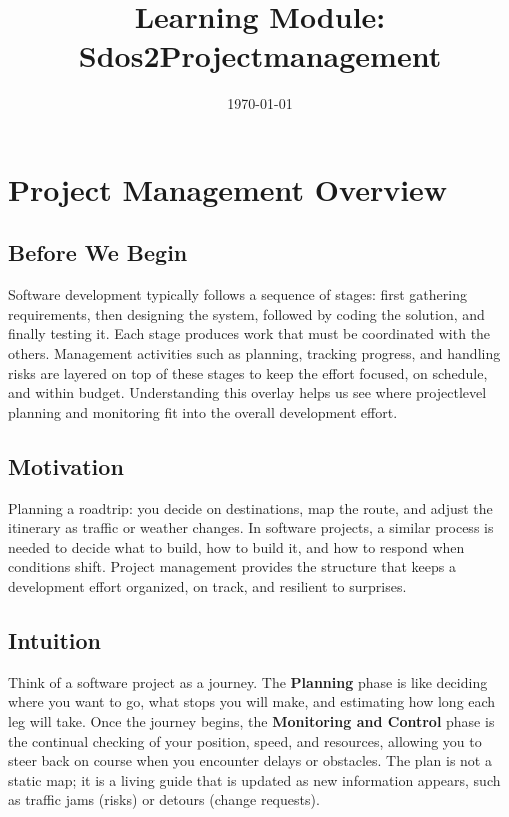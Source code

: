 \documentclass[12pt, a4paper]{article}
\title{Learning Module: Sdos2Projectmanagement}
\author{}
\date{\today}
\begin{document}
\maketitle
\thispagestyle{empty}
\newpage

\tableofcontents
\newpage


\section{Project Management Overview}

\subsection{Before We Begin}
Software development typically follows a sequence of stages: first gathering requirements, then designing the system, followed by coding the solution, and finally testing it.  Each stage produces work that must be coordinated with the others.  Management activities such as planning, tracking progress, and handling risks are layered on top of these stages to keep the effort focused, on schedule, and within budget.  Understanding this overlay helps us see where projectlevel planning and monitoring fit into the overall development effort.  

\subsection{Motivation}
Planning a roadtrip: you decide on destinations, map the route, and adjust the itinerary as traffic or weather changes.  In software projects, a similar process is needed to decide what to build, how to build it, and how to respond when conditions shift.  Project management provides the structure that keeps a development effort organized, on track, and resilient to surprises.  

\subsection{Intuition}
Think of a software project as a journey.  The \textbf{Planning} phase is like deciding where you want to go, what stops you will make, and estimating how long each leg will take.  Once the journey begins, the \textbf{Monitoring and Control} phase is the continual checking of your position, speed, and resources, allowing you to steer back on course when you encounter delays or obstacles.  The plan is not a static map; it is a living guide that is updated as new information appears, such as traffic jams (risks) or detours (change requests).  
\end{document}
